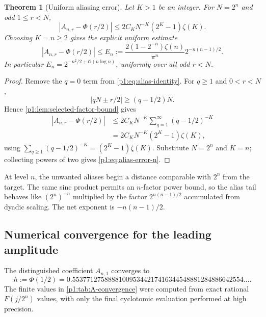 \documentclass[11pt,oneside]{article}
\newtheorem{theorem}{Theorem}[section]
\theoremstyle{definition}
\theoremstyle{remark}
\newcommand{\bigO}{\mathcal O}
\newcommand{\PhiU}{\Phi}
\begin{document}
\begin{theorem}[Uniform aliasing error]\label{p1:thm:alias-error}
Let $K>1$ be an integer.  For $N=2^n$ and odd $1\le r<N$,
\begin{equation}\label{p1:eq:alias-error-general}
 \boxed{
 |A_{n,r}-\PhiU(r/2)|
 \le 2C_KN^{-K}(2^K-1)\zeta(K).}
\end{equation}
Choosing $K=n\ge2$ gives the explicit uniform estimate
\begin{equation}\label{p1:eq:alias-error-n}
 \boxed{
 |A_{n,r}-\PhiU(r/2)|
 \le E_n:=
 \frac{2(1-2^{-n})\zeta(n)}{\pi^n}
 2^{-n(n-1)/2}.}
\end{equation}
In particular $E_n=2^{-n^2/2+\bigO(n\log n)}$, uniformly over all odd
$r<N$.
\end{theorem}

\begin{proof}
Remove the $q=0$ term from \eqref{p1:eq:alias-identity}.  For $q\ge1$ and
$0<r<N$,
\[
 |qN\pm r/2|\ge(q-1/2)N.
\]
Hence \cref{p1:lem:selected-factor-bound} gives
\begin{align*}
 |A_{n,r}-\PhiU(r/2)|
 &\le 2C_KN^{-K}\sum_{q=1}^{\infty}(q-1/2)^{-K}\\
 &=2C_KN^{-K}(2^K-1)\zeta(K),
\end{align*}
using
$\sum_{q\ge1}(q-1/2)^{-K}=(2^K-1)\zeta(K)$.
Substitute $N=2^n$ and $K=n$; collecting powers of two gives
\eqref{p1:eq:alias-error-n}.
\end{proof}

\begin{remark}
At level $n$, the unwanted aliases begin a distance comparable with $2^n$
from the target.  The same sinc product permits an $n$-factor power bound, so
the alias tail behaves like $(2^n)^{-n}$ multiplied by the factor
$2^{n(n-1)/2}$ accumulated from dyadic scaling.  The net exponent is
$-n(n-1)/2$.
\end{remark}

\subsection{Numerical convergence for the leading amplitude}

The distinguished coefficient $A_{n,1}$ converges to
\begin{equation}\label{p1:eq:h-value}
 h:=\PhiU(1/2)
 =0.553771275888810095344217416344548881284886642554\ldots.
\end{equation}
The finite values in \cref{p1:tab:A-convergence} were computed from exact rational
$F(j/2^n)$ values, with only the final cyclotomic evaluation performed at high
precision.
\end{document}
